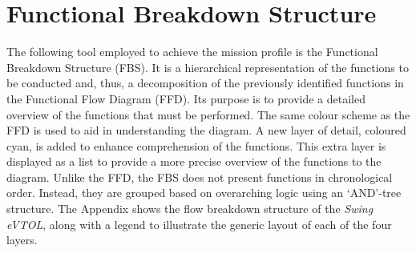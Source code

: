 \section{Functional Breakdown Structure}\label{sec:FBS}
The following tool employed to achieve the mission profile is the Functional Breakdown Structure (FBS). It is a hierarchical representation of the functions to be conducted and, thus, a decomposition of the previously identified functions in the Functional Flow Diagram (FFD). Its purpose is to provide a detailed overview of the functions that must be performed.
The same colour scheme as the FFD is used to aid in understanding the diagram.
A new layer of detail, coloured cyan, is added to enhance comprehension of the functions.
This extra layer is displayed as a list to provide a more precise overview of the functions to the diagram.
Unlike the FFD, the FBS does not present functions in chronological order.
Instead, they are grouped based on overarching logic using an \enquote*{AND}-tree structure.
The Appendix shows the flow breakdown structure of the \textit{Swing eVTOL}, along with a legend to illustrate the generic layout of each of the four layers.
